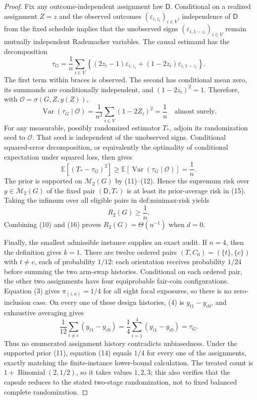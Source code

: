 \documentclass{article}
\begin{document}
\begin{proof}
Fix any outcome-independent assignment law \(\mathsf D\).  Conditional on a realized assignment \(Z=z\) and the observed outcomes \((\varepsilon_{i,z_i})_{i\in V}\), independence of \(\mathsf D\) from the fixed schedule implies that the unobserved signs \((\varepsilon_{i,1-z_i})_{i\in V}\) remain mutually independent Rademacher variables.  The causal estimand has the decomposition
\[
 \tau_G
 =\frac1n\sum_{i\in V}
   \left\{(2z_i-1)\varepsilon_{i,z_i}
   +(1-2z_i)\varepsilon_{i,1-z_i}\right\}. \tag{13}
\]
The first term within braces is observed.  The second has conditional mean zero, its summands are conditionally independent, and \((1-2z_i)^2=1\).  Therefore, with \(\mathscr O=\sigma(G,Z,y(Z))\),
\[
 \operatorname{Var}(\tau_G\mid\mathscr O)
 =\frac1{n^2}\sum_{i\in V}(1-2Z_i)^2
 =\frac1n
 \quad\text{almost surely}. \tag{14}
\]
For any measurable, possibly randomized estimator \(T_*\), adjoin its randomization seed to \(\mathscr O\).  That seed is independent of the unobserved signs.  Conditional squared-error decomposition, or equivalently the optimality of conditional expectation under squared loss, then gives
\[
 \mathbb E[(T_* -\tau_G)^2]
 \ge \mathbb E[\operatorname{Var}(\tau_G\mid\mathscr O)]
 =\frac1n. \tag{15}
\]
The prior is supported on \(\mathcal M_2(G)\) by (11)--(12).  Hence the supremum risk over \(y\in\mathcal M_2(G)\) of the fixed pair \((\mathsf D,T_*)\) is at least its prior-average risk in (15).  Taking the infimum over all eligible pairs in \(\text{def:minimax-risk}\) yields
\[
 R_2(G)\ge\frac1n. \tag{16}
\]
Combining (10) and (16) proves \(R_2(G)=\Theta(n^{-1})\) when \(d=0\).

Finally, the smallest admissible instance supplies an exact audit.  If \(n=4\), then the definition gives \(k=1\).  There are twelve ordered pairs \((T,C_0)=(\{t\},\{c\})\) with \(t\ne c\), each of probability \(1/12\): each orientation receives probability \(1/24\) before summing the two arm-swap histories.  Conditional on each ordered pair, the other two assignments have four equiprobable fair-coin configurations.  Equation (3) gives \(\pi_{(i,a)}=1/4\) for all eight focal exposures, so there is no zero-inclusion case.  On every one of these design histories, (4) is \(y_{t1}-y_{c0}\), and exhaustive averaging gives
\[
 \frac1{12}\sum_{t\ne c}(y_{t1}-y_{c0})
 =\frac14\sum_{i=1}^4(y_{i1}-y_{i0})
 =\tau_G. \tag{17}
\]
Thus no enumerated assignment history contradicts unbiasedness.  Under the supported prior (11), equation (14) equals \(1/4\) for every one of the assignments, exactly matching the finite-instance lower-bound calculation.  The treated count is \(1+\operatorname{Binomial}(2,1/2)\), so it takes values \(1,2,3\); this also verifies that the capsule reduces to the stated two-stage randomization, not to fixed balanced complete randomization.
\end{proof}
\end{document}
